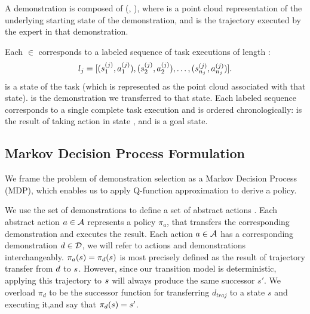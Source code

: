 A demonstration \demovar{} is composed of (, ),
where  is a point cloud representation of the underlying
starting state of the demonstration, and  is
the trajectory executed by the expert in that demonstration.

Each  $\in$ 
corresponds to a labeled sequence of
task executions of length :
\begin{equation*}
l_{j} = [(s_{1}^{(j)}, a_{1}^{(j)}),
(s_{2}^{(j)}, a_{2}^{(j)}), \ldots, (s_{n_{j}}^{(j)}, a_{n_{j}}^{(j)})].
\end{equation*}
 is a state of the task (which is represented as
the point cloud associated with that state).  is
the demonstration we transferred to that state. Each labeled sequence
 corresponds to a single complete task execution and is ordered
chronologically:  is the result of taking action
 in state , and
 is a goal state.


\subsection{Markov Decision Process Formulation}
\label{subsec:form_mdp}

We frame the problem of demonstration selection as a Markov Decision
Process (MDP), which enables us to apply Q-function approximation to derive a
policy.

We use the set of demonstrations \demoset{} to define a set of abstract actions 
\actionset{}. Each abstract action $a \in \mathcal{A}$ represents a 
policy $\pi_a$, that transfers the corresponding demonstration and executes 
the result. Each action $a \in \mathcal{A}$ has a corresponding demonstration $d
\in \mathcal{D}$, we will refer to actions and demonstrations
interchangeably. $\pi_{a}(s) =
\pi_{d}(s)$ is most precisely defined as the result of 
trajectory transfer from $d$ to $s$. However, since our
transition model is deterministic, applying this trajectory to $s$ will
always produce the same successor $s'$. We overload
$\pi_{d}$ to be the successor function for transferring $d_{traj}$ to a state $s$ 
and executing it,and say that $\pi_{d}(s) = s'$.

